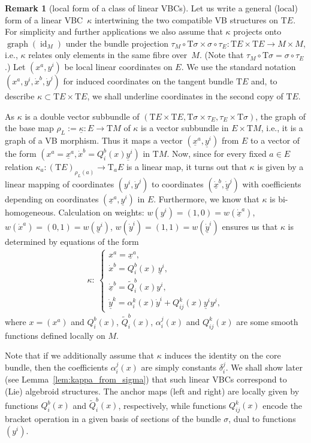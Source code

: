 \documentclass[10pt,a4paper]{amsart}
\newcommand{\ZM}{{VBC}} %
\newcommand{\wt}[1]{\widetilde{#1}} %
\newcommand{\und}{\underline}
\newcommand{\graf}{\operatorname{graph}}
\newcommand{\id}{\operatorname{id}}
\newcommand{\ra}{\rightarrow}
\newcommand{\rhoL}{\rho_L} %
\newcommand{\T}{\mathrm{T}} %
\numberwithin{equation}{section}
\theoremstyle{definition}
\newtheorem{rem}[thm]{Remark}
\begin{document}
\begin{rem}[local form of a class of linear \ZM s]\label{rem:local_kappa_a}
Let us write a general (local) form of a linear \ZM\ $\kappa$ intertwining the two compatible VB structures on $\T E$. For simplicity and further applications we also assume that $\kappa$ projects onto $\graf(\id_M)$ under the bundle projection $\tau_M\circ \T\sigma \times \sigma \circ \tau_E\colon \T E\times \T E\ra M\times M$, i.e., $\kappa$ relates only elements in the same fibre over~$M$. (Note that $\tau_M\circ \T\sigma = \sigma \circ \tau_E$.) Let $(x^a, y^i)$ be local linear coordinates on $E$. We use the standard notation $(x^a, y^i,\dot x^b, \dot y^j)$ for induced coordinates on the tangent bundle $\T E$ and, to describe $\kappa \subset \T E\times \T E$, we shall underline coordinates in the second copy of $\T E$.

 As $\kappa$ is a double vector subbundle of $(\T E\times \T E, \T\sigma \times \tau_E, \tau_E\times \T \sigma)$, the graph of the base map $\rhoL:=\und{\kappa}\colon E\ra \T M$ of $\kappa$ is a vector subbundle in $E\times \T M$, i.e., it is a graph of a VB morphism. Thus it maps a vector $(\und{x}^a,\und{y}^i)$ from $E$ to a vector of the form $(x^a=\und{x}^a, \dot x^b=Q^b_i(x)\und{y}^i)$ in $\T M$. Now, since for every fixed $a\in E$ relation $\kappa_a\colon (\T E)_{\rhoL(a)}\ra \T_a E$ is a linear map, it turns out that $\kappa$ is given by a linear mapping of coordinates $(y^i,\dot{y}^j)$ to coordinates $(\und{\dot x}^b,\und{\dot y}^j)$ with coefficients depending on coordinates $(\und{x}^a,\und{y}^i)$ in $E$. Furthermore, we know that $\kappa$ is bi-homogeneous. Calculation on weights: $w(y^i)=(1,0)=w(\dot{\und{x}}^a)$, $w(\dot{x}^a)=(0,1)=w(\und{y}^i)$, $w(\dot{y}^i)=(1,1)=w(\dot{\und{y}}^i)$ ensures us that $\kappa$ is determined by equations of the form
\begin{gather}\label{eqn:kappa_local}
\kappa\colon \
\begin{cases}
x^a=\und{x}^a, \\
\dot{x}^b = Q^b_i(x)\, \und{y}^i, \\
 \dot{\und{x}}^b = \wt{Q}^b_i(x) y^i, \\
 \dot{\und{y}}^k = \alpha^k_i(x) \dot{y}^i + Q^k_{ij}(x) \und{y}^iy^j,
	\end{cases}
\end{gather}
where $x = (x^a)$ and $Q^b_i(x)$, $\wt{Q}^b_i(x)$, $\alpha^j_i(x)$ and $Q^k_{ij}(x)$ are some smooth functions defined locally on $M$.

 Note that if we additionally assume that $\kappa$ induces the identity on the core bundle, then the coefficients $\alpha^j_i(x)$ are simply constants $\delta^j_i$. We shall show later (see Lemma~\ref{lem:kappa_from_sigma}) that such linear \ZM s correspond to (Lie) algebroid structures. The anchor maps (left and right) are locally given by functions $Q^b_i(x)$ and $\wt{Q}^b_i(x)$, respectively, while functions $Q^k_{ij}(x)$ encode the bracket operation in a given basis of sections of the bundle $\sigma$, dual to functions $(y^i)$.
\end{rem}
\end{document}
